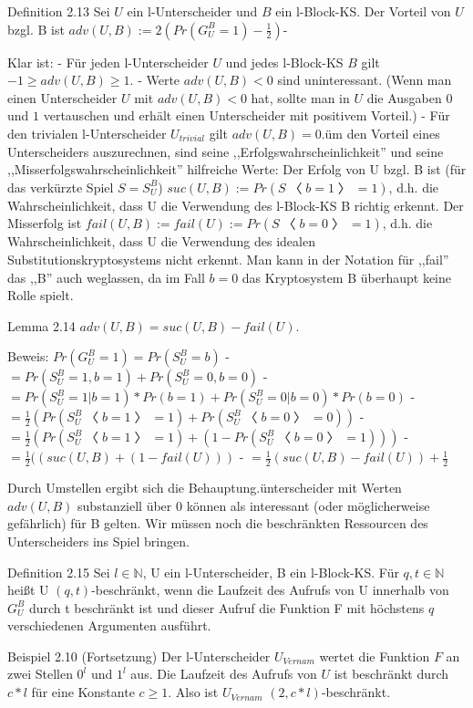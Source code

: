 \documentclass[a4paper]{article}
\begin{document}
\begin{multicols}{3}
        Definition 2.13 Sei $U$ ein l-Unterscheider und $B$ ein l-Block-KS. Der Vorteil von $U$ bzgl. B ist $adv(U,B):= 2(Pr(G^B_U=1)-\frac{1}{2})$-

        Klar ist:
        - Für jeden l-Unterscheider $U$ und jedes l-Block-KS $B$ gilt $-1\geq adv(U,B)\geq 1$.
        - Werte $adv(U,B)<0$ sind uninteressant. (Wenn man einen Unterscheider $U$ mit $adv(U,B)<0$ hat, sollte man in $U$ die Ausgaben $0$ und $1$ vertauschen und erhält einen Unterscheider mit positivem Vorteil.)
        - Für den trivialen l-Unterscheider $U_{trivial}$ gilt $adv(U,B) = 0$.üm den Vorteil eines Unterscheiders auszurechnen, sind seine ,,Erfolgswahrscheinlichkeit'' und seine ,,Misserfolgswahrscheinlichkeit'' hilfreiche Werte: Der Erfolg von U bzgl. B ist (für das verkürzte Spiel $S=S_U^B$) $suc(U,B) := Pr(S〈b= 1〉= 1)$, d.h. die Wahrscheinlichkeit, dass U die Verwendung des l-Block-KS B richtig erkennt. Der Misserfolg ist $fail(U,B) := fail(U) := Pr(S〈b= 0〉= 1)$, d.h. die Wahrscheinlichkeit, dass U die Verwendung des idealen Substitutionskryptosystems nicht erkennt. Man kann in der Notation für ,,fail'' das ,,B'' auch weglassen, da im Fall $b=0$ das Kryptosystem B überhaupt keine Rolle spielt.

        Lemma 2.14 $adv(U,B) = suc(U,B)-fail(U)$.

        Beweis: $Pr(G^B_U= 1) = Pr(S_U^B=b)$
        - $= Pr(S_U^B= 1,b= 1) + Pr(S_U^B= 0,b= 0)$
        - $= Pr(S_U^B= 1|b= 1)* Pr(b= 1) + Pr(S^B_U= 0|b= 0)*Pr(b= 0)$
        - $=\frac{1}{2}( Pr(S_U^B〈b= 1〉= 1) + Pr(S_U^B〈b= 0〉= 0))$
        - $=\frac{1}{2}( Pr(S_U^B〈b= 1〉= 1) + (1-Pr(S_U^B〈b= 0〉= 1)))$
        - $=\frac{1}{2}( (suc(U,B) + (1-fail(U)))$
        - $=\frac{1}{2}(suc(U,B)-fail(U)) + \frac{1}{2}$

        Durch Umstellen ergibt sich die Behauptung.ünterscheider mit Werten $adv(U,B)$ substanziell über 0 können als interessant (oder möglicherweise gefährlich) für B gelten. Wir müssen noch die beschränkten Ressourcen des Unterscheiders ins Spiel bringen.

        Definition 2.15 Sei $l\in\mathbb{N}$, U ein l-Unterscheider, B ein l-Block-KS. Für $q,t\in\mathbb{N}$ heißt U $(q,t)$-beschränkt, wenn die Laufzeit des Aufrufs von U innerhalb von $G^B_U$ durch t beschränkt ist und dieser Aufruf die Funktion F mit höchstens $q$ verschiedenen Argumenten ausführt.

        Beispiel 2.10 (Fortsetzung) Der l-Unterscheider $U_{Vernam}$ wertet die Funktion $F$ an zwei Stellen $0^l$ und $1^l$ aus. Die Laufzeit des Aufrufs von $U$ ist beschränkt durch $c*l$ für eine Konstante $c\geq 1$. Also ist $U_{Vernam}$ $(2,c*l)$-beschränkt.


\end{multicols}
\end{document}

